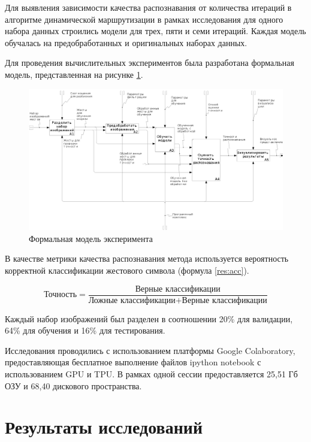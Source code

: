 Для выявления зависимости качества распознавания от количества итераций в алгоритме динамической маршрутизации в рамках исследования для одного набора данных строились модели для трех, пяти и семи итераций. Каждая модель обучалась на предобработанных и оригинальных наборах данных.

Для проведения вычислительных экспериментов была разработана формальная модель, представленная на рисунке \ref{res:research}.

\begin{figure}
	\centering
	\includegraphics[width=\textwidth]{inc/img/research}
	\caption{Формальная модель эксперимента}
	\label{res:research}
\end{figure}

В качестве метрики качества распознавания метода используется вероятность корректной классификации жестового символа (формула \ref{res:acc}).

\begin{equation}
\label{res:acc}
\text{Точность} = \frac{\text{Верные классификации}}{\text{Ложные классификации} + \text{Верные классификации}}
\end{equation}

Каждый набор изображений был разделен в соотношении 20\% для валидации, 64\% для обучения и 16\% для тестирования. 

Исследования проводились с использованием платформы Google Colaboratory, предоставляющая бесплатное выполнение файлов ipython notebook с использованием GPU и TPU. В рамках одной сессии предоставляется 25,51 Гб ОЗУ и 68,40 дискового пространства.

\section{Результаты исследований}

